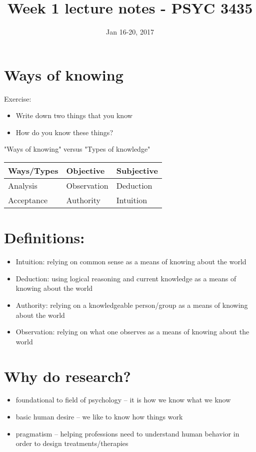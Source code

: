 \documentclass[11pt]{article}
\date{Jan 16-20, 2017}
\title{Week 1 lecture notes - PSYC 3435}
\begin{document}
\maketitle

\section*{Ways of knowing}
\label{sec-1}
Exercise:
\begin{itemize}
\item Write down two things that you know
\item How do you know these things?
\end{itemize}

"Ways of knowing" versus "Types of knowledge"

\begin{center}
\begin{tabular}{lll}
Ways/Types & Objective & Subjective\\
\hline
Analysis & Observation & Deduction\\
Acceptance & Authority & Intuition\\
\hline
\end{tabular}
\end{center}


\section*{Definitions:}
\label{sec-2}
\begin{itemize}
\item Intuition: relying on common sense as a means of knowing about the world
\item Deduction: using logical reasoning and current knowledge as a means of knowing about the world
\item Authority: relying on a knowledgeable person/group as a means of knowing about the world
\item Observation: relying on what one observes as a means of knowing about the world
\end{itemize}

\section*{Why do research?}
\label{sec-3}
\begin{itemize}
\item foundational to field of psychology -- it is how we know what we know
\item basic human desire -- we like to know how things work
\item pragmatism -- helping professions need to understand human behavior in order to design treatments/therapies
\end{itemize}
\end{document}
